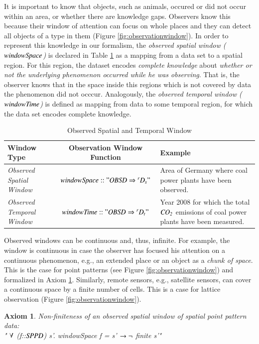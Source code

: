 \documentclass[final,authoryear,1p,times]{elsarticle}
\newtheorem{Axiom}{Axiom}
\begin{document}
It is important to know that objects, such as animals, occured or did not occur within an area, or whether there are knowledge gaps. Observers know this because their window of attention can focus on whole places and they can detect all objects of a type in them (Figure \ref{fig:observationwindow}). In order to represent this knowledge in our formalism, the \textit{observed spatial window (${\it windowSpace}$)} is declared in Table \ref{tab:windows} as a mapping from a data set to a spatial region. For this region, the dataset encodes \textit{complete knowledge} about \textit{whether or not the underlying phenomenon occurred while he was observing}. That is, the observer knows that in the space inside this regions which is  not covered by data the phenomenon did not occcur. Analogously, the \textit{observed temporal window (${\it windowTime}$)} is defined as mapping from data to some temporal region, for which the data set encodes complete knowledge.

\begin{table}[htb]
\caption{Observed Spatial and Temporal Window}
\label{tab:windows}
\begin{tabular}[h]{|p{2.5cm}|c|p{5cm}|}
			\hline
			\textbf{Window Type} & \textbf{Observation Window Function} &  \textbf{Example} \\
			\hline
			\textit{Observed Spatial Window} & ${\it windowSpace :: "OBSD \Rightarrow \prescript{r}{}D_{s}"}$ &  Area of Germany where coal power plants have been observed. \\
			\hline			
\textit{Observed Temporal Window} & ${\it windowTime :: "OBSD \Rightarrow \prescript{r}{}D_{t}"}$ & Year 2008 for which the total ${\it CO_2}$ emissions of coal power plants have been measured. \\
			\hline
\end{tabular}
\end{table}

Observed windows can be continuous and, thus, infinite. For example, the window is continuous in case the observer has focused his attention on a continuous phenomenon, e.g., an extended place or an object as a \textit{ chunk of space}. This is the case for point patterns (see Figure \ref{fig:observationwindow}) and  formalized in Axiom \ref{ax:infiniteSPPW}. Similarly, remote sensors, e.g., satellite sensors, can cover a continuous space by a finite number of cells. This is a case for lattice observation (Figure \ref{fig:observationwindow}). 

\begin{Axiom}
Non-finiteness of an observed spatial window of spatial point pattern data:\\
 " ${\it\forall}$ (f::${\it SPPD}$) s'. windowSpace f  = s' ${\it \rightarrow \neg}$ finite s'"
\label{ax:infiniteSPPW}
\end{Axiom}
\end{document}
